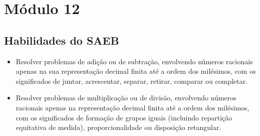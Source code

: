 \chapter{Módulo 12}


\section{Habilidades do SAEB}

\begin{itemize}
\item Resolver problemas de adição ou de subtração, envolvendo números
racionais apenas na sua representação decimal finita até a ordem dos
milésimos, com os significados de juntar, acrescentar, separar, retirar,
comparar ou completar.

\item Resolver problemas de multiplicação ou de divisão, envolvendo números
racionais apenas na representação decimal finita até a ordem dos
milésimos, com os significados de formação de grupos iguais (incluindo
repartição equitativa de medida), proporcionalidade ou disposição
retangular.
\end{itemize}



